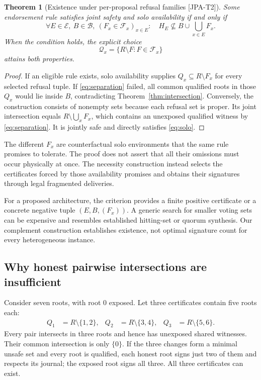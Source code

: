 \documentclass[11pt,a4paper]{article}
\newtheorem{theorem}{Theorem}\newtheorem{proposition}[theorem]{Proposition}\newtheorem{corollary}[theorem]{Corollary}
\theoremstyle{definition}\newtheorem{definition}{Definition}
\newcommand{\idtag}[1]{\textnormal{\textsf{[#1]}}}
\newcommand{\E}{\mathcal E}\newcommand{\B}{\mathcal B}\newcommand{\F}{\mathcal F}\newcommand{\Q}{\mathcal Q}
\begin{document}
\begin{theorem}[Existence under per-proposal refusal families \idtag{JPA-T2}]
\label{thm:existence}
Some endorsement rule satisfies joint safety and solo availability if and only if
\begin{equation}
\boxed{\forall E\in\E,\ B\in\B,\ (F_x\in\F_x)_{x\in E}:\quad
H_E\not\subseteq B\cup\bigcup_{x\in E}F_x.}
\label{eq:separation}
\end{equation}
When the condition holds, the explicit choice
\begin{equation}
\Q_x=\{R\setminus F:F\in\F_x\}
\label{eq:construction}
\end{equation}
attains both properties.
\end{theorem}
\begin{proof}
If an eligible rule exists, solo availability supplies $Q_x\subseteq R\setminus F_x$ for every selected refusal tuple. If \cref{eq:separation} failed, all common qualified roots in those $Q_x$ would lie inside $B$, contradicting Theorem~\ref{thm:intersection}. Conversely, the construction consists of nonempty sets because each refusal set is proper. Its joint intersection equals $R\setminus\bigcup_xF_x$, which contains an unexposed qualified witness by \cref{eq:separation}. It is jointly safe and directly satisfies \cref{eq:solo}.
\end{proof}
The different $F_x$ are counterfactual solo environments that the same rule promises to tolerate. The proof does not assert that all their omissions must occur physically at once. The necessity construction instead selects the certificates forced by those availability promises and obtains their signatures through legal fragmented deliveries.

For a proposed architecture, the criterion provides a finite positive certificate or a concrete negative tuple $(E,B,(F_x))$. A generic search for smaller voting sets can be expensive and resembles established hitting-set or quorum synthesis. Our complement construction establishes existence, not optimal signature count for every heterogeneous instance.

\subsection{Why honest pairwise intersections are insufficient}
Consider seven roots, with root 0 exposed. Let three certificates contain five roots each:
\begin{align*}
Q_1&=R\setminus\{1,2\},& Q_2&=R\setminus\{3,4\},& Q_3&=R\setminus\{5,6\}.
\end{align*}
Every pair intersects in three roots and hence has unexposed shared witnesses. Their common intersection is only $\{0\}$. If the three changes form a minimal unsafe set and every root is qualified, each honest root signs just two of them and respects its journal; the exposed root signs all three. All three certificates can exist.
\end{document}
